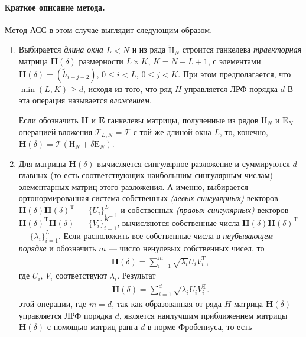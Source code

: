 \documentclass[specialist,
               substylefile = spbu_report.rtx,
               subf,href,colorlinks=true, 12pt]{disser}
\begin{document}
\paragraph{Краткое описание метода.}
Метод АСС в этом случае выглядит следующим образом.
\begin{enumerate}
	\item
	Выбирается {\it длина окна} $L<N$ и из ряда $\widetilde{\mathrm{H}}_N$ строится ганкелева {\it траекторная} матрица $\mathbf{H}(\delta)$ размерности
	$L\times K$, $K=N-L+1$, с элементами $\mathbf{H}(\delta)=(\widetilde{h}_{i+j-2})$, $0\leqslant i<L$, $0\leqslant j<K$. При этом предполагается, что $\min(L,K)\geqslant
	d$, исходя из того, что ряд $H$ управляется ЛРФ порядка $d$
	В \cite{GNZh01} эта операция называется {\it вложением}.
	
	Если обозначить $\mathbf{H}$ и $\mathbf{E}$ ганкелевы матрицы, полученные из  рядов $\mathrm{H}_N$ и $\mathrm{E}_N$ операцией вложения $\mathcal{T}_{L, N} = \mathcal{T}$ с той же
	длиной окна $L$, то, конечно,
	${\mathbf{H}}(\delta)=\mathcal{T}(\mathrm{H}_N + \delta\mathrm{E}_N)$.
	\item
	Для матрицы $\mathbf{H}(\delta)$ вычисляется сингулярное разложение и суммируются $d$ главных (то есть соответствующих наибольшим сингулярным
	числам) элементарных матриц этого разложения. А именно, выбирается ортонормированная система собственных \emph{(левых сингулярных)} векторов $\mathbf{H}(\delta)\mathbf{H}(\delta)^\mathrm{T}$ --- $\{U_i\}_{i=1}^L$ и собственных \emph{(правых сингулярных)} векторов $\mathbf{H}(\delta)^\mathrm{T}\mathbf{H}(\delta)$ --- $\{V_i\}_{i=1}^K$, вычисляются собственные числа $\mathbf{H}(\delta)\mathbf{H}(\delta)^\mathrm{T}$ --- $\{\lambda_i\}_{i=1}^L$. Если расположить все собственные числа в \emph{неубывающем порядке} и обозначить $m$ --- число ненулевых собственных чисел, то
	\begin{gather*}
		\mathbf{H}(\delta) = \sum^m_{i=1}\sqrt{\lambda_i}U_iV_i^\mathrm{T},
	\end{gather*}
где $U_i,\,V_i$ соответствуют $\lambda_i$. Результат
 \begin{gather*}
 	\widetilde{\mathbf{H}}(\delta) = \sum^d_{i=1}\sqrt{\lambda_i}U_iV_i^\mathrm{T}.
 \end{gather*} этой операции, где $m = d$, так как образованная от ряда $H$ матрица $\mathbf{H}(\delta)$ управляется ЛРФ порядка $d$, является наилучшим приближением
	матрицы $\mathbf{H}(\delta)$ с помощью матриц ранга $d$ в норме Фробениуса, то есть
	\begin{gather*}

\end{gather*}
\end{enumerate}
\end{document}
